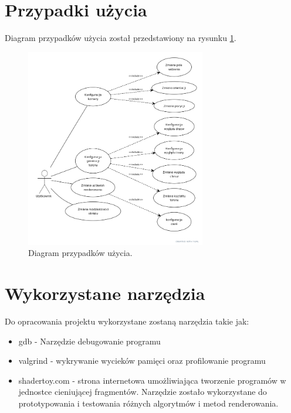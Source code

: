 \section{Przypadki użycia}
Diagram przypadków użycia został przedstawiony na rysunku \ref{fig:usecase}.
\begin{figure}
\centering
\includegraphics[width=0.7\textwidth]{./graf/usecase.png}
\caption{Diagram przypadków użycia.}
\label{fig:usecase}
\end{figure}

\section{Wykorzystane narzędzia}

Do opracowania projektu wykorzystane zostaną narzędzia takie jak:
\begin{itemize}
\item gdb - Narzędzie  debugowanie programu
  \item valgrind - wykrywanie wycieków pamięci oraz profilowanie programu
\item shadertoy.com - strona internetowa umożliwiająca tworzenie programów w jednostce cieniującej fragmentów. Narzędzie zostało wykorzystane do prototypowania i testowania różnych algorytmów i metod renderowania.
\end{itemize}

